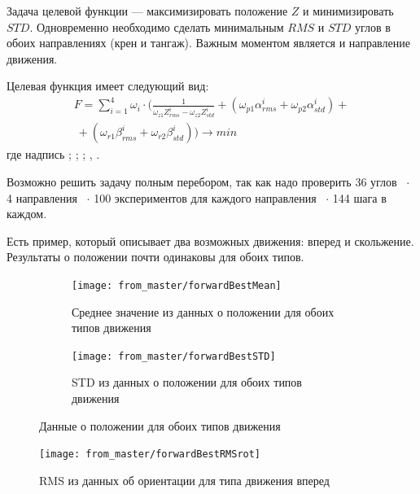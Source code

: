 Задача целевой функции --- максимизировать положение $Z$ и минимизировать $STD$. Одновременно необходимо сделать минимальным $RMS$ и $STD$ углов в обоих направлениях (крен и тангаж). Важным моментом является и направление движения.

Целевая функция имеет следующий вид:
\begin{align}
    \label{eq:objective}
    F = \sum\limits_{i=1}^4 \omega_{i} \cdot (\frac{1}{\omega_{z1}Z_{rms}^i - \omega_{z2}Z_{std}^i}  + ( \omega_{p1}\alpha_{rms}^i + \omega_{p2}\alpha_{std}^i) + \nonumber \\\ + (\omega_{r1}\beta_{rms}^i + \omega_{r2}\beta_{std}^i)) \rightarrow min
\end{align}
где надпись ; ; ; , .

Возможно решить задачу полным перебором, так как надо проверить 36 углов ~$\cdot$ 4 направления ~$\cdot$ 100 экспериментов для каждого направления ~$\cdot$ 144 шага в каждом.

Есть пример, который описывает два возможных движения: вперед и скольжение. Результаты о положении почти одинаковы для обоих типов.

\begin{figure}[H]
\begin{subfigure}{1\textwidth}
\centering\texttt{[image: from\_master/forwardBestMean]} 
\caption{Среднее значение из данных о положении для обоих типов движения}
\label{fig:forwardBestMean}
\end{subfigure}

\begin{subfigure}{1\textwidth}
\centering\texttt{[image: from\_master/forwardBestSTD]} 
\caption{STD из данных о положении для обоих типов движения}
\label{fig:forwardBestSTD}
\end{subfigure}
 
\caption{Данные о положении для обоих типов движения}
\label{fig:forwardPosion}
\end{figure}

\begin{figure}[H]
\centering\texttt{[image: from\_master/forwardBestRMSrot]} 
\caption{RMS из данных об ориентации для типа движения вперед}
\label{fig:forwardBestRMSrot}
\end{figure}

